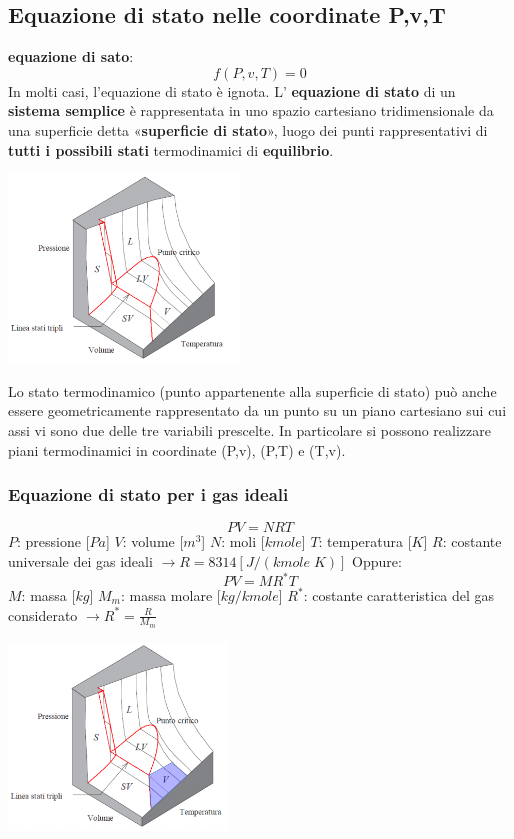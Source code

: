 \subsection{Equazione di stato nelle coordinate P,v,T}
\textbf{equazione di sato}:
\[
    f(P,v,T) = 0
\]
In molti casi, l'equazione di stato è ignota.\newline
\newline
L’ \textbf{equazione di stato} di un \textbf{sistema semplice} è rappresentata in uno spazio cartesiano tridimensionale da una superficie detta «\textbf{superficie di stato}», luogo dei punti rappresentativi di \textbf{tutti i possibili stati} termodinamici di \textbf{equilibrio}.
\begin{center}
    \includegraphics[height=5cm]{../L01/img4.PNG}
\end{center}
Lo stato termodinamico (punto appartenente alla superficie di stato) può anche essere geometricamente
rappresentato da un punto su un piano cartesiano sui cui assi vi sono due delle tre variabili prescelte.\newline
In particolare si possono realizzare piani termodinamici in coordinate (P,v), (P,T) e (T,v).
\subsubsection{Equazione di stato per i gas ideali}
\[
    PV=NRT
\]
$P$: pressione [$Pa$]\newline
$V$: volume [$m^3$]\newline
$N$: moli [$kmole$]\newline
$T$: temperatura [$K$]\newline
$R$: costante universale dei gas ideali $\rightarrow R = 8314 [J/(kmole \; K)]$\newline
Oppure:
\[
    PV = MR^*T
\]
$M$: massa [$kg$]\newline
$M_m$: massa molare [$kg/kmole$]\newline
$R^*$: costante caratteristica del gas considerato $\rightarrow R^* = \frac{R}{M_m}$
\begin{center}
    \includegraphics[height=5cm]{../L01/img5.PNG}
\end{center}
